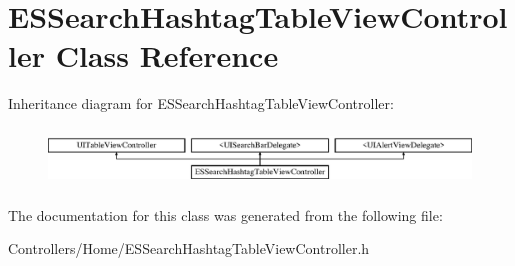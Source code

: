 \hypertarget{interface_e_s_search_hashtag_table_view_controller}{}\section{E\+S\+Search\+Hashtag\+Table\+View\+Controller Class Reference}
\label{interface_e_s_search_hashtag_table_view_controller}
Inheritance diagram for E\+S\+Search\+Hashtag\+Table\+View\+Controller\+:\begin{figure}[H]
\begin{center}
\leavevmode
\includegraphics[height=1.568627cm]{interface_e_s_search_hashtag_table_view_controller}
\end{center}
\end{figure}


The documentation for this class was generated from the following file\+:\begin{DoxyCompactItemize}
\item 
Controllers/\+Home/E\+S\+Search\+Hashtag\+Table\+View\+Controller.\+h\end{DoxyCompactItemize}
